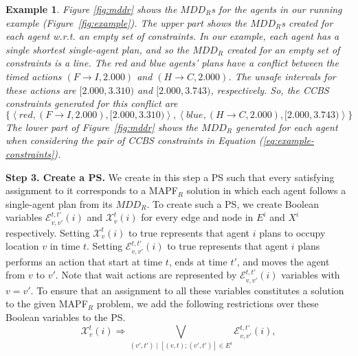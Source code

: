 \documentclass[review]{elsarticle}
\newtheorem{example}{Example}
\newcommand{\tuple}[1]{\ensuremath{\left \langle #1 \right \rangle }}
\newcommand{\mddr}{\ensuremath{MDD_R}\xspace}
\newcommand{\mddrs}{\ensuremath{MDD_R}s\xspace}
\newcommand\konstantin[1]{\nb{\textbf{Konstantin:}}{red}{#1}}
\newcommand\roni[1]{\nb{\textbf{Roni:}}{green}{#1}}
\newcommand{\ccbs}{\ac{CCBS}\xspace}
\newcommand{\ps}{\ac{PS}\xspace}
\newcommand{\mapfr}{\ac{MAPF}$_R$\xspace}
\begin{document}
\begin{example}
	Figure \ref{fig:mddr} shows the \mddrs for the agents in our running example (Figure~\ref{fig:example}). 
	The upper part shows the \mddrs created for each agent w.r.t. an empty set of constraints. 
	In our example, each agent has a single shortest single-agent plan, and so the \mddr 
	created for an empty set of constraints is a line. 
	The red and blue agents' plans have a conflict between the timed actions $(F\rightarrow I, 2.000)$ and $(H \rightarrow C, 2.000)$. 
	The unsafe intervals for these actions are $[2.000,3.310)$ and $[2.000,3.743)$, respectively. 
	So, the \ccbs constraints generated for this conflict are
	\begin{equation}
	\{ \tuple{red, (F\rightarrow I, 2.000), [2.000,3.310)}, 
	\tuple{blue, (H\rightarrow C, 2.000), [2.000,3.743)} \}
	\label{eq:example-constraints}
	\end{equation}
	The lower part of Figure~\ref{fig:mddr} shows the \mddr generated for each agent when considering the pair of \ccbs constraints in Equation (\ref{eq:example-constraints}).
\end{example}




\textbf{Step 3. Create a \ps.} We create in this step a \ps such that every satisfying assignment to it corresponds to a \mapfr solution in which each agent follows a single-agent plan from its \mddr. 
To create such a \ps, we create Boolean variables $\mathcal{E}_{v,v'}^{t,t'}(i)$ and $\mathcal{X}_{v}^{t}(i)$ 
for every edge and node in $E^i$ and $X^i$ respectively. 
Setting $\mathcal{X}_v^t(i)$ to true represents that agent $i$ plans to occupy location $v$ in time $t$. 
Setting $\mathcal{E}_{v,v'}^{t,t'}(i)$ to true represents that agent $i$ plans performs an action that start at time $t$, ends at time $t'$, and moves the agent from $v$ to $v'$. 
Note that wait actions are represented by $\mathcal{E}_{v,v'}^{t,t'}(i)$ variables with $v=v'$. 
To ensure that an assignment to all these variables constitutes a solution to the given \mapfr problem, 
we add the following restrictions over these Boolean variables to the \ps. %
\begin{equation}
{  \mathcal{X}_v^t(i) \Rightarrow \bigvee_{(v',t')\;|\;[(v,t);(v',t')] \in E^i}{\mathcal{E}^{t,t'}_{v,v'}(i)},
}
\label{eq-1}
\end{equation}
\end{document}
